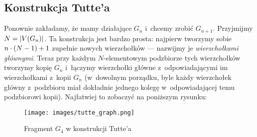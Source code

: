     \subsection{Konstrukcja Tutte'a}
        Ponownie zakładamy, że mamy działające $G_n$ i~chcemy zrobić $G_{n + 1}$. Przyjmijmy $N = \left|V\pars{G_n}\right|$. Ta konstrukcja jest bardzo prosta: najpierw tworzymy sobie $n \cdot \left(N - 1\right) + 1$ zupełnie nowych wierzchołków --- nazwijmy je \emph{wierzchołkami głównymi}. Teraz przy każdym $N$-elementowym podzbiorze tych wierzchołków tworzymy kopię $G_n$ i~łączymy wierzchołki główne z~odpowiadającymi im wierzchołkami z~kopii $G_n$ (w~dowolnym porządku, byle każdy wierzchołek główny z~podzbioru miał dokładnie jednego kolegę w~odpowiadającej temu podzbiorowi kopii). Najłatwiej to zobaczyć na poniższym rysunku:
        
        \begin{figure}[H]
            \centering
            \texttt{[image: images/tutte\_graph.png]}
            \caption{Fragment $G_4$ w konstrukcji Tutte'a}
        \end{figure}
        
